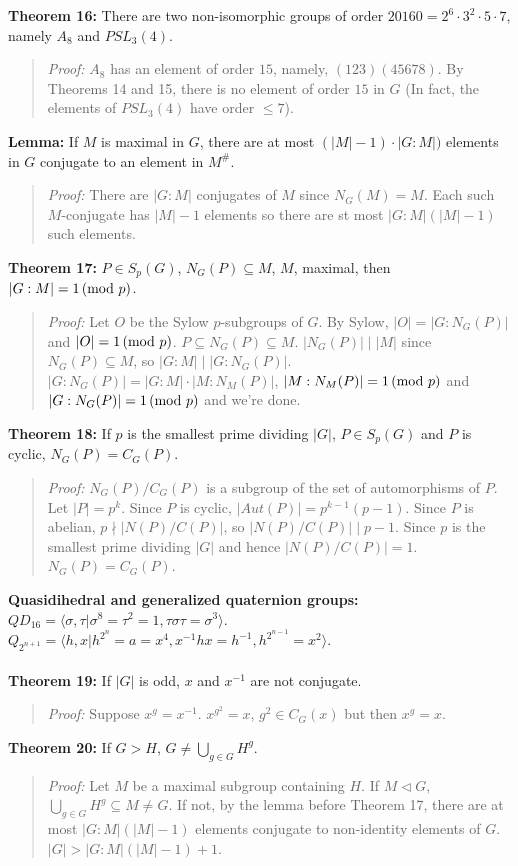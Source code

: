 {\bf Theorem 16:} There are two non-isomorphic groups of order $20160= 2^6 \cdot 3^2 \cdot 5 \cdot 7$,
namely $A_8$  and $PSL_3(4)$.
\begin{quote}
\emph{Proof:}
$A_8$ has an element of order $15$, namely, $(123)(45678)$.  By Theorems 14 and 15, there
is no element of order $15$ in $G$ (In fact, the elements
of $PSL_3(4)$ have order $\leq 7$).
\end{quote}
{\bf Lemma:} If $M$ is maximal in $G$, there are at most $(|M|-1) \cdot |G:M|)$ elements in $G$ conjugate to an element
in $M^{\#}$.
\begin{quote}
\emph{Proof:}  There are $|G:M|$ conjugates of $M$ since $N_G(M)=M$.  Each such $M$-conjugate has $|M|-1$ elements so
there are st most $|G:M|(|M|-1)$ such elements.
\end{quote}
{\bf Theorem 17:} $P \in S_p(G)$, $N_G(P) \subseteq M$, $M$, maximal, then $|G:M|=1 \thinspace \textnormal{(mod } p \textnormal{)}$.
\begin{quote}
\emph{Proof:}
Let $O$ be the Sylow $p$-subgroups of $G$.  By Sylow, $|O| = |G:N_G(P)|$ and $|O| = 1 \thinspace \textnormal{(mod } p \textnormal{)}$.
$P \subseteq N_G(P) \subseteq M$.
$|N_G(P)| \mid |M|$ since $N_G(P) \subseteq M$, so $|G:M| \mid |G:N_G(P)|$.
$|G:N_G(P)| = |G:M| \cdot |M:N_M(P)|$, $|M:N_M(P)| =1 \thinspace \textnormal{(mod } p \textnormal{)}$ and $|G:N_G(P)| = 1 \thinspace \textnormal{(mod } p \textnormal{)}$ and we're done.
\end{quote}
{\bf Theorem 18:} If $p$ is the smallest prime dividing $|G|$, $P \in S_p(G)$ and $P$ is cyclic, $N_G(P)=C_G(P)$.
\begin{quote}
\emph{Proof:}
$N_G(P)/C_G(P)$ is a subgroup of the set of automorphisms of $P$.  Let $|P|=p^k$.  Since $P$ is cyclic, $|Aut(P)|= p^{k-1} (p-1)$.
Since $P$ is abelian, $p \nmid |N(P)/C(P)|$, so $|N(P)/C(P)| \mid p-1$.  Since $p$ is the smallest prime dividing $|G|$ and hence
$|N(P)/C(P)| = 1$.  $N_G(P)=C_G(P)$.
\end{quote}
{\bf Quasidihedral and generalized quaternion groups:}
$QD_{16} = \langle \sigma, \tau | \sigma^8=\tau^2=1, \tau \sigma \tau = \sigma^3 \rangle$.
$Q_{2^{n+1}} = \langle h, x | h^{2^n}= a = x^4, x^{-1} h x = h^{-1}, h^{2^{n-1}}= x^2 \rangle$.
\\
\\
{\bf Theorem 19:} If $|G|$ is odd, $x$ and $x^{-1}$ are not conjugate.
\begin{quote}
\emph{Proof:}
Suppose $x^g = x^{-1}$. $x^{g^2}=x$, $g^2 \in C_G(x)$ but then $x^g=x$.
\end{quote}
{\bf Theorem 20:} If $G>H$, $G \ne \bigcup_{g \in G} H^g$.
\begin{quote}
\emph{Proof:}
Let $M$ be a maximal subgroup containing $H$.  If $M \lhd G$, $\bigcup_{g \in G} H^g \subseteq M \ne G$.  If not,
by the lemma before Theorem 17, there are at most $|G:M|(|M|-1)$ elements conjugate to non-identity elements of $G$.
$|G| > |G:M|(|M|-1) + 1$.
\end{quote}
